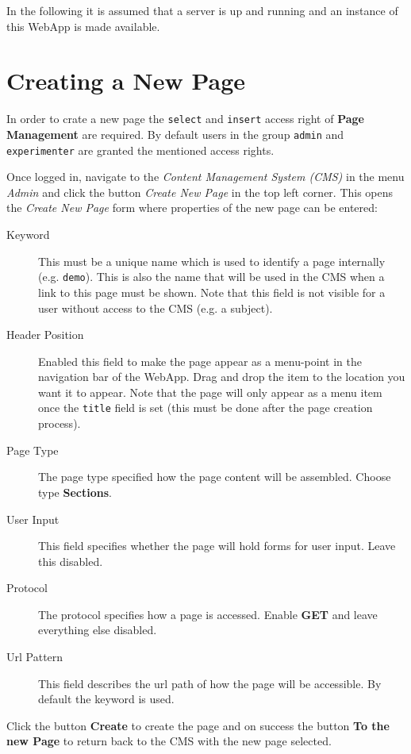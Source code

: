 \documentclass[a4paper,oneside]{book}
\begin{document}
In the following it is assumed that a server is up and running and an instance of this WebApp is made available.

\chapter{Creating a New Page}
\label{sec.quick}
In order to crate a new page the \texttt{select} and \texttt{insert} access right of \textbf{Page Management} are required.
By default users in the group \texttt{admin} and \texttt{experimenter} are granted the mentioned access rights.

Once logged in, navigate to the \emph{Content Management System (CMS)} in the menu \emph{Admin} and click the button \emph{Create New Page} in the top left corner.
This opens the \emph{Create New Page} form where properties of the new page can be entered:
\begin{description}
    \item[Keyword]
        This must be a unique name which is used to identify a page internally (e.g. \texttt{demo}).
        This is also the name that will be used in the CMS when a link to this page must be shown.
        Note that this field is not visible for a user without access to the CMS (e.g. a subject).
    \item[Header Position]
        Enabled this field to make the page appear as a menu-point in the navigation bar of the WebApp.
        Drag and drop the item to the location you want it to appear.
        Note that the page will only appear as a menu item once the \texttt{title} field is set (this must be done after the page creation process).
    \item[Page Type]
        The page type specified how the page content will be assembled.
        Choose type \textbf{Sections}.
    \item[User Input]
        This field specifies whether the page will hold forms for user input.
        Leave this disabled.
    \item[Protocol]
        The protocol specifies how a page is accessed.
        Enable \textbf{GET} and leave everything else disabled.
    \item[Url Pattern]
        This field describes the url path of how the page will be accessible.
        By default the keyword is used.
\end{description}

Click the button \textbf{Create} to create the page and on success the button \textbf{To the new Page} to return back to the CMS with the new page selected.
\end{document}
